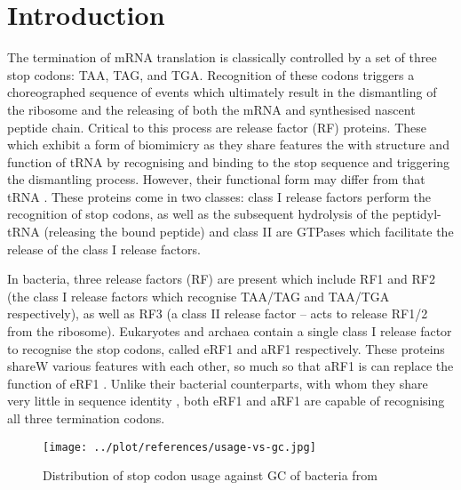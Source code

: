 \documentclass[../main.tex]{subfile}
\begin{document}
 \section{Introduction}
    The termination of mRNA translation is classically controlled by a set of three stop codons: TAA, TAG, and TGA. Recognition of these codons triggers a choreographed sequence of events which ultimately result in the dismantling of the ribosome and the releasing of both the mRNA and synthesised nascent peptide chain.
    Critical to this process are release factor (RF) proteins. These which exhibit a form of biomimicry as they share features the with structure and function of tRNA by recognising and binding to the stop sequence and triggering the dismantling process. However, their functional form may differ from that tRNA \autocite{Nakamura2003}.
    These proteins come in two classes: class I release factors perform the recognition of stop codons, as well as the subsequent hydrolysis of the peptidyl-tRNA (releasing the bound peptide) and class II are GTPases which facilitate the release of the class I release factors.

    In bacteria, three release factors (RF) are present which include RF1 and RF2 (the class I release factors which recognise TAA/TAG and TAA/TGA respectively), as well as RF3 (a class II release factor -- acts to release RF1/2 from the ribosome).
    Eukaryotes and archaea contain a single class I release factor to recognise the stop codons, called eRF1 and aRF1 respectively. These proteins shareW various features with each other, so much so that aRF1 is can replace the function of eRF1 \autocite{Dontsova2000}. Unlike their bacterial counterparts, with whom they share very little in sequence identity \autocite{Inagaki2000}, both eRF1 and aRF1 are capable of recognising all three termination codons.

    \begin{wrapfigure}{r}{7.5cm}
        \centering
        \texttt{[image: ../plot/references/usage-vs-gc.jpg]}
        \caption{Distribution of stop codon usage against GC of bacteria from \mancite\cite{Korkmaz2014}}
        \label{fig:intro/codon-gc}
    \end{wrapfigure}
\end{document}
